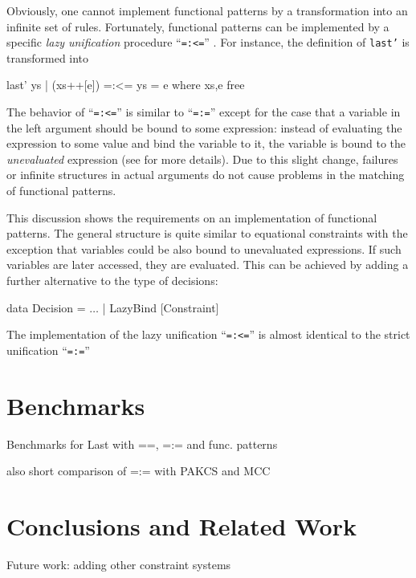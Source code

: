 \documentclass{llncs}
\newcommand{\code}[1]{\mbox{\small\texttt{#1}}}
\newcommand{\ccode}[1]{``\code{#1}''}
\begin{document}
Obviously, one cannot implement functional patterns by
a transformation into an infinite set of rules.
Fortunately, functional patterns can be implemented by
a specific \emph{lazy unification} procedure \ccode{=:<=}
\cite{AntoyHanus05LOPSTR}.
For instance, the definition of \code{last'} is transformed into
\begin{curry}
  last' ys | (xs++[e]) =:<= ys
           = e   where xs,e free
\end{curry}
The behavior of \ccode{=:<=} is similar to \ccode{=:=}
except for the case that a variable in the left argument
should be bound to some expression: instead of evaluating
the expression to some value and bind the variable to it,
the variable is bound to the \emph{unevaluated} expression
(see \cite{AntoyHanus05LOPSTR} for more details).
Due to this slight change, failures or infinite structures
in actual arguments do not cause problems in the matching
of functional patterns.

This discussion shows the requirements on an implementation
of functional patterns. The general structure
is quite similar to equational constraints
with the exception that variables could be also bound
to unevaluated expressions. If such variables are later
accessed, they are evaluated.
This can be achieved by adding a further alternative
to the type of decisions:
\begin{haskell}
data Decision = $\ldots$ | LazyBind [Constraint]
\end{haskell}
%
The implementation of the lazy unification \ccode{=:<=}
is almost identical to the strict unification \ccode{=:=}

         
\section{Benchmarks}
\label{sec:Benchmarks}

Benchmarks for Last with ==, =:= and func. patterns

also short comparison of =:= with PAKCS and MCC


\section{Conclusions and Related Work}
\label{sec:Conclusions}

Future work: adding other constraint systems




\end{document}
